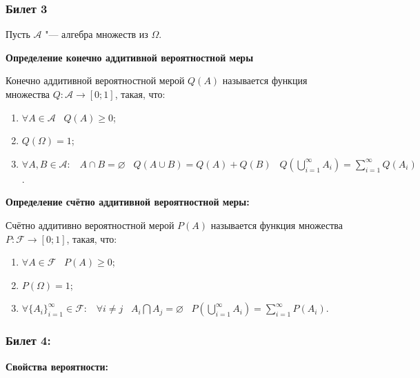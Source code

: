 \subsubsection{Билет 3}

Пусть $\mathcal{A}$ "--- алгебра множеств из
$\Omega$.

\textbf{Определение конечно аддитивной
вероятностной меры}
    \smallskip

    Конечно аддитивной вероятностной мерой $Q(A)$
    называется функция множества $Q: \mathcal{A}
    \rightarrow [0; 1]$, такая, что:

    \begin{enumerate}
        \item{$\forall A \in \mathcal{A} \;\;\;
        Q(A) \geq 0$;}
        \item{$Q(\Omega) = 1$;}
        \item{$\forall A, B \in \mathcal{A} : 
        \;\;\; A \cap B = \varnothing \;\;\;
        Q(A \cup B) = Q(A) + Q(B) \;\;\;
        Q\left(\bigcup\limits_{i = 1}^{\infty} A_i\right) = \sum_{i = 1}^{\infty}
        Q(A_i)$.}
    \end{enumerate}
    \bigskip  

\textbf{Определение счётно аддитивной 
вероятностной меры:}
    \smallskip

    Счётно аддитивно вероятностной мерой $P(A)$
    называется функция множества $P: \mathcal{F}
    \rightarrow [0; 1]$, такая, что:

    \begin{enumerate}
        \item{$\forall A \in \mathcal{F} \;\;\;
        P(A) \geq 0$;}
        \item{$P(\Omega) = 1$;}
        \item{$\forall \{A_i\}_{i = 1}^{\infty}
        \in \mathcal{F} : \;\;\; \forall
        i \neq j \;\;\; A_i \bigcap A_j = 
        \varnothing \;\;\; P\left(\bigcup\limits_{i = 1}^{
        \infty} A_i\right) = \sum_{i = 1}^{\infty}
        P(A_i)$.}
    \end{enumerate}
    \bigskip    

\subsubsection{Билет 4:}

\textbf{Свойства вероятности:}
    \smallskip

